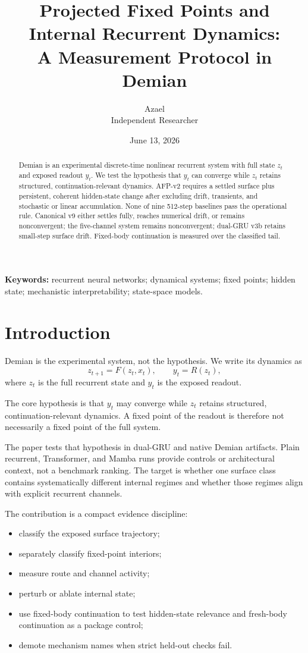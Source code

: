 \documentclass[11pt]{article}
\title{Projected Fixed Points and Internal Recurrent Dynamics:\\A Measurement Protocol in Demian}
\author{Azael\\Independent Researcher}
\date{June 13, 2026}
\begin{document}
\maketitle

\begin{abstract}
Demian is an experimental discrete-time nonlinear recurrent system with full
state $z_t$ and exposed readout $y_t$. We test the hypothesis that $y_t$ can
converge while $z_t$ retains structured, continuation-relevant dynamics.
AFP-v2 requires a settled surface plus persistent, coherent hidden-state change
after excluding drift, transients, and stochastic or linear accumulation. None
of nine 512-step baselines pass the operational rule. Canonical v9 either
settles fully, reaches numerical drift, or remains nonconvergent; the
five-channel system remains nonconvergent; dual-GRU v3b retains small-step
surface drift. Fixed-body continuation is measured over the classified tail.
\end{abstract}

\noindent\textbf{Keywords:} recurrent neural networks; dynamical systems;
fixed points; hidden state; mechanistic interpretability; state-space models.

\section{Introduction}

Demian is the experimental system, not the hypothesis. We write its dynamics
as
\[
  z_{t+1}=F(z_t,x_t), \qquad y_t=R(z_t),
\]
where $z_t$ is the full recurrent state and $y_t$ is the exposed readout.

The core hypothesis is that $y_t$ may converge while $z_t$ retains structured,
continuation-relevant dynamics. A fixed point of the readout is therefore not
necessarily a fixed point of the full system.

The paper tests that hypothesis in dual-GRU and native Demian artifacts. Plain
recurrent, Transformer, and Mamba runs provide controls or architectural
context, not a benchmark ranking. The target is whether one surface class
contains systematically different internal regimes and whether those regimes
align with explicit recurrent channels.

The contribution is a compact evidence discipline:

\begin{itemize}
  \item classify the exposed surface trajectory;
  \item separately classify fixed-point interiors;
  \item measure route and channel activity;
  \item perturb or ablate internal state;
  \item use fixed-body continuation to test hidden-state relevance and fresh-body continuation as a package control;
  \item demote mechanism names when strict held-out checks fail.
\end{itemize}
\end{document}
